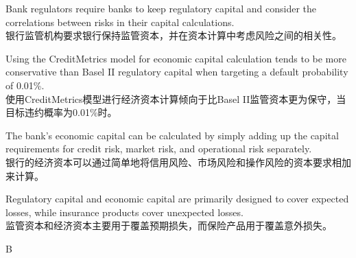 \documentclass{article}
\begin{document}
        \begin{choices}
            \item Bank regulators require banks to keep regulatory capital and consider the correlations between risks in their capital calculations. \\
            银行监管机构要求银行保持监管资本，并在资本计算中考虑风险之间的相关性。
            
            \item Using the CreditMetrics model for economic capital calculation tends to be more conservative than Basel II regulatory capital when targeting a default probability of 0.01\%. \\
            使用CreditMetrics模型进行经济资本计算倾向于比Basel II监管资本更为保守，当目标违约概率为0.01\%时。
            
            \item The bank's economic capital can be calculated by simply adding up the capital requirements for credit risk, market risk, and operational risk separately. \\
            银行的经济资本可以通过简单地将信用风险、市场风险和操作风险的资本要求相加来计算。
            
            \item Regulatory capital and economic capital are primarily designed to cover expected losses, while insurance products cover unexpected losses. \\
            监管资本和经济资本主要用于覆盖预期损失，而保险产品用于覆盖意外损失。
        \end{choices}
        
        \begin{correctanswer}
        B
        \end{correctanswer}
        
\end{document}
